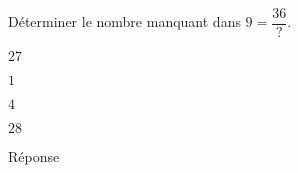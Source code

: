 \begin{exercice}
    Déterminer le nombre manquant dans $9=\dfrac{36}{\text{?}}$.
    \begin{ChoixQCM}{4}
        \item $27$
        \item $1$
        \item $4$
        \item $28$
    \end{ChoixQCM}
\end{exercice}
\begin{corrige}
    Réponse 
\end{corrige}